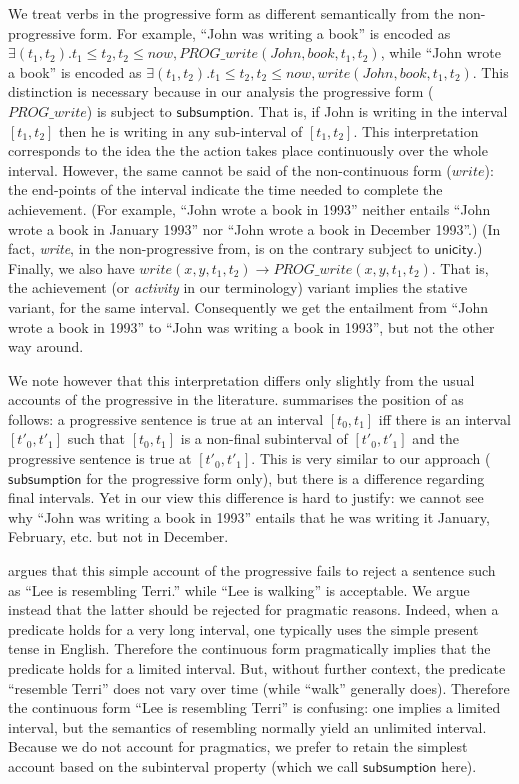 \documentclass[a4paper,twoside]{article}
\newcommand\constant[1]{\mathsf{#1}}
\begin{document}
We treat verbs in the progressive form as different semantically from
the non-progressive form. For example, ``John was writing a book'' is
encoded as
$∃(t_1, t_2). t_1≤ t_2, t_2 ≤ now, PROG\_write(John,book,t_1,t_2)$,
while ``John wrote a book'' is encoded as
$∃(t_1, t_2). t_1≤ t_2, t_2 ≤ now, write(John,book,t_1,t_2)$. This distinction is
necessary because in our analysis the progressive form ($PROG\_write$) is subject to
$\constant{subsumption}$. That is, if John is writing in the interval
$[t_1,t_2]$ then he is writing in any sub-interval of
$[t_1,t_2]$. This interpretation corresponds to the idea the the action takes place continuously over the whole interval.
However, the same cannot be said of the non-continuous form ($write$): the
end-points of the interval indicate the time needed to complete the
achievement. (For example, ``John wrote a book in 1993'' neither
entails ``John wrote a book in January 1993'' nor ``John wrote a book
in December 1993''.) (In fact, \emph{write}, in the non-progressive
from, is on the contrary subject to $\constant{unicity}$.) Finally, we
also have $write(x,y,t_1,t_2) → PROG\_write(x,y,t_1,t_2)$. That is,
the achievement (or \emph{activity} in our terminology) variant implies the stative variant, for the
same interval.  Consequently we get the entailment from ``John wrote a
book in 1993'' to ``John was writing a book in 1993'', but not the other way around.

We note however that this interpretation differs only slightly from
the usual accounts of the progressive in the
literature.  summarises the position of
\citet{bennett1978toward} as follows: a progressive sentence is true
at an interval $[t_0,t_1]$ iff there is an interval $[t'_0,t'_1]$ such
that $[t_0,t_1]$ is a non-final subinterval of $[t'_0,t'_1]$ and the
progressive sentence is true at $[t'_0,t'_1]$. This is very similar to
our approach ($\constant{subsumption}$ for the progressive form only),
but there is a difference regarding final intervals. Yet in our view
this difference is hard to justify: we cannot see why ``John was
writing a book in 1993'' entails that he was writing it January,
February, etc. but not in December.

 argues that this simple account of the
progressive fails to reject a sentence such as ``Lee is resembling
Terri.'' while ``Lee is walking'' is acceptable. We argue instead that
the latter should be rejected for pragmatic reasons. Indeed, when a
predicate holds for a very long interval, one typically uses the
simple present tense in English. Therefore the continuous form
pragmatically implies that the predicate holds for a limited interval.
But, without further context, the predicate ``resemble Terri'' does
not vary over time (while ``walk'' generally does). Therefore the
continuous form ``Lee is resembling Terri'' is confusing: one implies
a limited interval, but the semantics of resembling normally yield an unlimited interval.
%
Because we do not account for pragmatics, we prefer to retain the
simplest account based on the subinterval property (which we call
$\constant{subsumption}$ here).
\end{document}
